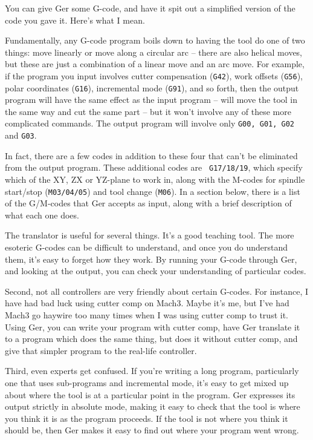 \documentclass[titlepage,oneside,10pt]{article}
\begin{document}
You can give Ger some G-code, and have it spit out a simplified
version of the code you gave it. Here's what I mean.

Fundamentally, any G-code program boils down to having the tool do one
of two things: move linearly or move along a circular arc -- there are
also helical moves, but these are just a combination of a linear move
and an arc move. For example, if the program you input involves cutter
compensation ({\tt G42}), work offsets ({\tt G56}), polar coordinates
({\tt G16}), incremental mode ({\tt G91}), and so forth, then the output
program will have the same effect as the input program -- will move
the tool in the same way and cut the same part -- but it won't involve
any of these more complicated commands. The output program will
involve only {\tt G00, G01, G02} and {\tt G03}.

In fact, there are a few codes in addition to these four that can't
be eliminated from the output program. These additional codes are {\tt
  G17/18/19}, which specify which of the XY, ZX or YZ-plane to work
in, along with the M-codes for spindle start/stop ({\tt M03/04/05}) and
tool change ({\tt M06}). In a section below, there is a list of the
G/M-codes that Ger accepts as input, along with a brief description of
what each one does. 

The translator is useful for several things. It's a good
teaching tool. The more esoteric G-codes can be difficult to
understand, and once you do understand them, it's easy to forget how they
work. By running your G-code through Ger, and looking at the output,
you can check your understanding of particular codes. 

Second, not all controllers are very friendly about certain
G-codes. For instance, I have had bad luck using cutter comp on Mach3.
Maybe it's me, but I've had Mach3 go haywire too many times
when I was using cutter comp to trust it. Using Ger, you can write
your program with cutter comp, have Ger translate it to a program
which does the same thing, but does it without cutter comp, and give
that simpler program to the real-life controller.

Third, even experts get confused. If you're writing a long program,
particularly one that uses sub-programs and incremental mode, it's
easy to get mixed up about where the tool is at a particular point in
the program. Ger expresses its output strictly in absolute mode,
making it easy to check that the tool is where you think it is as the
program proceeds. If the tool is not where you think it should be, then Ger
makes it easy to find out where your program went wrong.
\end{document}
